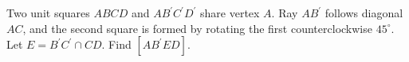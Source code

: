 Two unit squares $ABCD$ and $AB^{\prime}C^{\prime}D^{\prime}$ share vertex $A$. Ray $AB^{\prime}$ follows diagonal $AC$, and the second square is formed by rotating the first counterclockwise $45^\circ$. Let $E=B^{\prime}C^{\prime}\cap CD$. Find $[AB^{\prime}ED]$.
